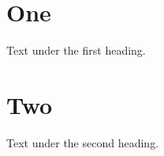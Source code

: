 \documentclass[a4paper,twocolumn]{article}
\begin{document}
\section{One}
Text under the first heading.
\section{Two}
Text under the second heading.
\end{document}
